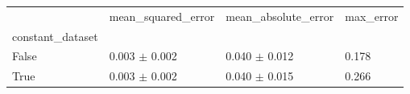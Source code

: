 \begin{tabular}{llll}
\toprule
 & mean_squared_error & mean_absolute_error & max_error \\
constant_dataset &  &  &  \\
\midrule
False & 0.003 $\pm$ 0.002 & 0.040 $\pm$ 0.012 & 0.178 \\
True & 0.003 $\pm$ 0.002 & 0.040 $\pm$ 0.015 & 0.266 \\
\bottomrule
\end{tabular}
